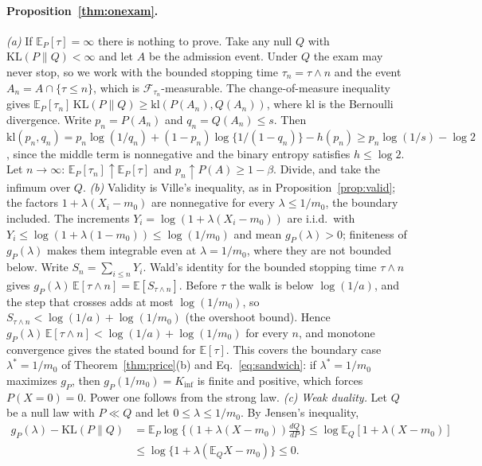 \paragraph{Proposition~\ref{thm:onexam}.}
\emph{(a)} If $\mathbb E_P[\tau]=\infty$ there is nothing to prove. Take any null $Q$ with $\mathrm{KL}(P\|Q)<\infty$ and let $A$ be the admission event. Under $Q$ the exam may never stop, so we work with the bounded stopping time $\tau_n=\tau\wedge n$ and the event $A_n=A\cap\{\tau\le n\}$, which is $\mathcal F_{\tau_n}$-measurable. The change-of-measure inequality \citep[Lemma~1]{kaufmann2016complexity} gives $\mathbb E_P[\tau_n]\,\mathrm{KL}(P\|Q)\ge\mathrm{kl}(P(A_n),Q(A_n))$, where $\mathrm{kl}$ is the Bernoulli divergence. Write $p_n=P(A_n)$ and $q_n=Q(A_n)\le s$. Then $\mathrm{kl}(p_n,q_n)=p_n\log(1/q_n)+(1-p_n)\log\{1/(1-q_n)\}-h(p_n)\ge p_n\log(1/s)-\log2$, since the middle term is nonnegative and the binary entropy satisfies $h\le\log2$. Let $n\to\infty$: $\mathbb E_P[\tau_n]\uparrow\mathbb E_P[\tau]$ and $p_n\uparrow P(A)\ge1-\beta$. Divide, and take the infimum over $Q$.
\emph{(b)} Validity is Ville's inequality, as in Proposition~\ref{prop:valid}; the factors $1+\lambda(X_i-m_0)$ are nonnegative for every $\lambda\le1/m_0$, the boundary included. The increments $Y_i=\log(1+\lambda(X_i-m_0))$ are i.i.d.\ with $Y_i\le\log(1+\lambda(1-m_0))\le\log(1/m_0)$ and mean $g_P(\lambda)>0$; finiteness of $g_P(\lambda)$ makes them integrable even at $\lambda=1/m_0$, where they are not bounded below. Write $S_n=\sum_{i\le n}Y_i$. Wald's identity for the bounded stopping time $\tau\wedge n$ gives $g_P(\lambda)\,\mathbb E[\tau\wedge n]=\mathbb E[S_{\tau\wedge n}]$. Before $\tau$ the walk is below $\log(1/a)$, and the step that crosses adds at most $\log(1/m_0)$, so $S_{\tau\wedge n}<\log(1/a)+\log(1/m_0)$ (the overshoot bound). Hence $g_P(\lambda)\,\mathbb E[\tau\wedge n]<\log(1/a)+\log(1/m_0)$ for every $n$, and monotone convergence gives the stated bound for $\mathbb E[\tau]$. This covers the boundary case $\lambda^*=1/m_0$ of Theorem~\ref{thm:price}(b) and Eq.~\eqref{eq:sandwich}: if $\lambda^*=1/m_0$ maximizes $g_P$, then $g_P(1/m_0)=K_{\inf}$ is finite and positive, which forces $P(X=0)=0$. Power one follows from the strong law.
\emph{(c)} \emph{Weak duality.} Let $Q$ be a null law with $P\ll Q$ and let $0\le\lambda\le1/m_0$. By Jensen's inequality,
\begin{align*}
g_P(\lambda)-\mathrm{KL}(P\|Q)&=\mathbb E_P\log\Big\{(1+\lambda(X-m_0))\frac{dQ}{dP}\Big\}\le\log\mathbb E_Q[1+\lambda(X-m_0)]\\
&\le\log\{1+\lambda(\mathbb E_QX-m_0)\}\le0.
\end{align*}
